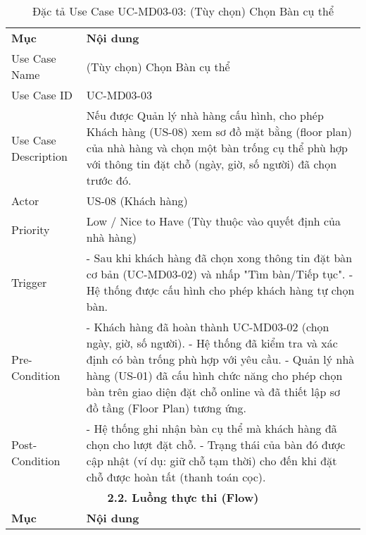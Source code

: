 \begin{longtable}{|m{4cm}|p{11cm}|}
\caption{Đặc tả Use Case UC-MD03-03: (Tùy chọn) Chọn Bàn cụ thể} \label{tab:uc_md03_03} \\
\hline

\endhead %
\hline
\endfoot %
\hline
\endlastfoot %
\multicolumn{2}{|c|}{\textbf{2.1. Tóm tắt (Summary)}} \\
\hline
\textbf{Mục} & \textbf{Nội dung} \\
\hline
Use Case Name & (Tùy chọn) Chọn Bàn cụ thể \\
\hline
Use Case ID & UC-MD03-03 \\
\hline
Use Case Description & Nếu được Quản lý nhà hàng cấu hình, cho phép Khách hàng (US-08) xem sơ đồ mặt bằng (floor plan) của nhà hàng và chọn một bàn trống cụ thể phù hợp với thông tin đặt chỗ (ngày, giờ, số người) đã chọn trước đó. \\
\hline
Actor & US-08 (Khách hàng) \\
\hline
Priority & Low / Nice to Have (Tùy thuộc vào quyết định của nhà hàng) \\
\hline
Trigger & - Sau khi khách hàng đã chọn xong thông tin đặt bàn cơ bản (UC-MD03-02) và nhấp "Tìm bàn/Tiếp tục". \newline - Hệ thống được cấu hình cho phép khách hàng tự chọn bàn. \\
\hline
Pre-Condition & - Khách hàng đã hoàn thành UC-MD03-02 (chọn ngày, giờ, số người). \newline - Hệ thống đã kiểm tra và xác định có bàn trống phù hợp với yêu cầu. \newline - Quản lý nhà hàng (US-01) đã cấu hình chức năng cho phép chọn bàn trên giao diện đặt chỗ online và đã thiết lập sơ đồ tầng (Floor Plan) tương ứng. \\
\hline
Post-Condition & - Hệ thống ghi nhận bàn cụ thể mà khách hàng đã chọn cho lượt đặt chỗ. \newline - Trạng thái của bàn đó được cập nhật (ví dụ: giữ chỗ tạm thời) cho đến khi đặt chỗ được hoàn tất (thanh toán cọc). \\
\hline
\multicolumn{2}{|c|}{\textbf{2.2. Luồng thực thi (Flow)}} \\
\hline
\textbf{Mục} & \textbf{Nội dung} \\
\hline

\end{longtable}
